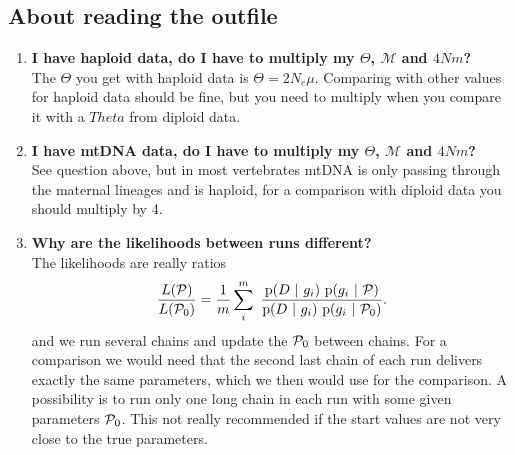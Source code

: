\subsection{About reading the outfile}
\begin{enumerate}
\item {\bf I have haploid data, do I have to multiply my $\Theta$, $\mathcal{M}$ and $4Nm$?}\\
The $\Theta$ you get with haploid data is $\Theta=2N_e\mu$. Comparing with other values for haploid data should be fine, but you need to multiply
when you compare it with a $Theta$ from diploid data.
\\
\item {\bf I have mtDNA data, do I have to multiply my $\Theta$, $\mathcal{M}$ and $4Nm$?}\\
See question above, but in most vertebrates mtDNA is only passing through the maternal
lineages and is haploid, for a comparison with diploid data 
you should multiply by 4.


\item {\bf Why are the likelihoods between runs different?}\\
The likelihoods are really ratios
$$
\frac{L(\P)}{L(\P_0)} = \frac{1}{m}\sum_i^m\ \frac{ \prob(D\ |\ g_i)\ \prob( g_i\ |\ \P)}
{\prob(D\ |\ g_i)\ \prob( g_i\ |\ \P_0)}.
$$
and we run several chains and update the $\P_0$ between chains.
For a comparison we would need that
the second last chain of each run delivers exactly the same
parameters, which we then would use for the comparison. A possibility is
to run only one long chain in each run with some given parameters
$\P_0$. This not really recommended if the start values are not
very close to the true parameters.


\end{enumerate}

